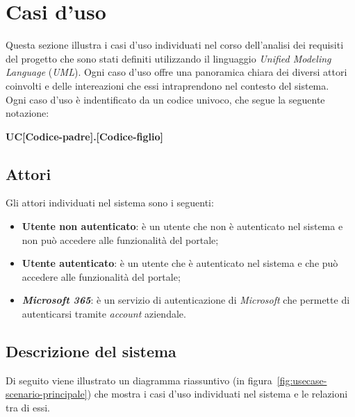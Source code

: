 \section{Casi d'uso}\label{sec:usecase}
Questa sezione illustra i casi d'uso individuati nel corso dell'analisi dei requisiti del progetto che sono stati definiti utilizzando il linguaggio \textit{Unified Modeling Language} (\textit{UML}).
Ogni caso d'uso offre una panoramica chiara dei diversi attori coinvolti e delle intereazioni che essi intraprendono nel contesto del sistema.\\
Ogni caso d'uso è indentificato da un codice univoco, che segue la seguente notazione:

\begin{center}
    \textbf{UC[Codice-padre].[Codice-figlio]}
  \end{center}

\subsection{Attori}
Gli attori individuati nel sistema sono i seguenti:
\begin{itemize}
    \item \textbf{Utente non autenticato}: è un utente che non è autenticato nel sistema e non può accedere alle funzionalità del portale;
    \item \textbf{Utente autenticato}: è un utente che è autenticato nel sistema e che può accedere alle funzionalità del portale;
    \item \textbf{\textit{Microsoft 365}}: è un servizio di autenticazione di \textit{Microsoft} che permette di autenticarsi tramite \textit{\textit{account}} aziendale.

\end{itemize}

\clearpage

\subsection{Descrizione del sistema}

Di seguito viene illustrato un diagramma riassuntivo (in figura~\ref{fig:usecase-scenario-principale}) che mostra i casi d'uso individuati nel sistema e le relazioni tra di essi.

